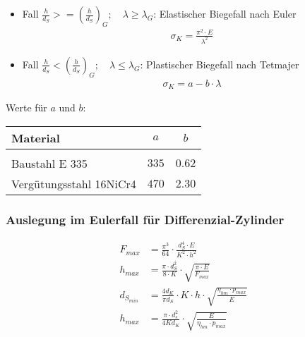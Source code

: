 \begin{itemize}
\item Fall $\frac{h}{d_S} >= \left( \frac{h}{d_S}\right)_G; \quad \lambda \geq \lambda_G$:
Elastischer Biegefall nach Euler
\begin{align*}
\sigma_K = \frac{\pi^2 \cdot E}{\lambda^2}
\end{align*}
%
\item Fall $\frac{h}{d_S} < \left( \frac{h}{d_S}\right)_G; \quad \lambda \leq \lambda_G$: 
Plastischer Biegefall nach Tetmajer
\begin{align*}
\sigma_K = a-b \cdot \lambda
\end{align*}
\end{itemize}

Werte für $a$ und $b$: \\

\begin{tabular}{lcc}
Material & $a$ & $b$ \\
\hline \\
Baustahl E 335 & $335$ & $0.62$ \\
Vergütungsstahl 16NiCr4 & $470$ & $2.30$
\end{tabular}


\subsubsection*{Auslegung im Eulerfall für Differenzial-Zylinder}
\begin{align*}
F_{max} &= \frac{\pi^3}{64} \cdot \frac{d_S^4 \cdot E}{K^2 \cdot h^2} \\
h_{max} &= \frac{\pi \cdot d_S^2}{8 \cdot K} \cdot \sqrt{\frac{\pi \cdot E}{F_{max}} } \\
d_{S_{min}} &= \frac{4 d_K}{\pi d_S} \cdot K \cdot h \cdot \sqrt{\frac{\eta_{hm} \cdot p_{max}}{E} } \\
h_{max} &= \frac{\pi \cdot d_s^2}{4 K d_K} \cdot \sqrt{\frac{E}{\eta_{hm} \cdot p_{max}} }
\end{align*}

\vfill